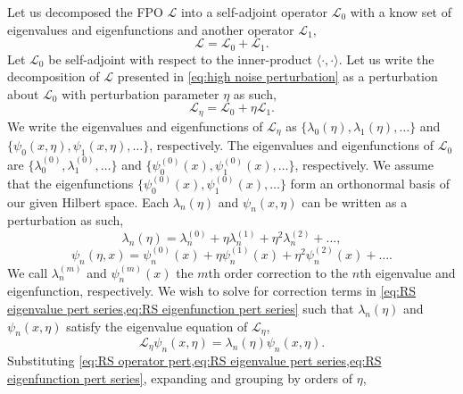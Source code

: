 \documentclass[11pt]{amsart}
\begin{document}
Let us decomposed the FPO $\mathcal{L}$ into a self-adjoint operator $\mathcal{L}_0$ with a know set of eigenvalues and eigenfunctions and another operator $\mathcal{L}_1$,
\begin{equation}
    \label{eq:high noise perturbation}
    \mathcal{L} = \mathcal{L}_0+\mathcal{L}_1.
\end{equation}
Let $\mathcal{L}_0$ be self-adjoint with respect to the inner-product $\langle\cdot,\cdot\rangle$. Let us write the decomposition of $\mathcal{L}$ presented in \cref{eq:high noise perturbation} as a perturbation about $\mathcal{L}_0$ with perturbation parameter $\eta$ as such,
\begin{equation}
    \label{eq:RS operator pert}
    \mathcal{L}_{\eta} = \mathcal{L}_0 + \eta \mathcal{L}_1.
\end{equation}
We write the eigenvalues and eigenfunctions of $\mathcal{L}_{\eta}$ as $\{\lambda_0(\eta), \lambda_1(\eta), \dots\}$ and $\{\psi_0(x,\eta),\psi_1(x,\eta),\dots\}$, respectively. The eigenvalues and eigenfunctions of $\mathcal{L}_0$ are $\{\lambda_0^{(0)},\lambda_1^{(0)},\dots\}$ and $\{\psi_0^{(0)}(x), \psi_1^{(0)}(x), \dots\}$, respectively. We assume that the eigenfunctions $\{\psi_0^{(0)}(x), \psi_1^{(0)}(x), \dots\}$ form an orthonormal basis of our given Hilbert space. Each $\lambda_n(\eta)$ and $\psi_n(x,\eta)$ can be written as a perturbation as such,
\begin{equation}
    \label{eq:RS eigenvalue pert series}
    \lambda_n(\eta) = \lambda_n^{(0)} + \eta\lambda_n^{(1)} + \eta^2\lambda_n^{(2)}+ \dots,
\end{equation}
\begin{equation}
    \label{eq:RS eigenfunction pert series}
    \psi_n(\eta,x) = \psi_n^{(0)}(x) + \eta\psi_n^{(1)}(x) + \eta^2\psi_n^{(2)}(x)+ \dots.
\end{equation}
We call $\lambda_n^{(m)}$ and $\psi_n^{(m)}(x)$ the $m$th order correction to the $n$th eigenvalue and eigenfunction, respectively. We wish to solve for correction terms in \cref{eq:RS eigenvalue pert series,eq:RS eigenfunction pert series} such that $\lambda_n(\eta)$ and $\psi_n(x,\eta)$ satisfy the eigenvalue equation of $\mathcal{L}_{\eta}$,
\begin{equation*}
    \mathcal{L}_{\eta} \psi_n(x,\eta) = \lambda_n(\eta)\psi_n(x,\eta).
\end{equation*}
Substituting \cref{eq:RS operator pert,eq:RS eigenvalue pert series,eq:RS eigenfunction pert series}, expanding and grouping by orders of $\eta$,
\end{document}
